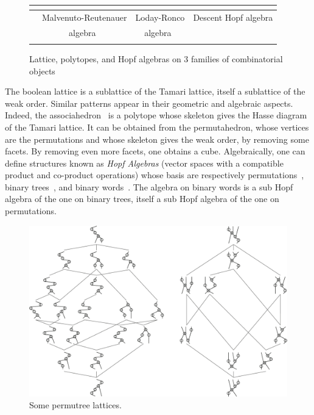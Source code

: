 \documentclass[a4paper,12pt]{article}
\begin{document}
\begin{figure}[h]
\begin{tabular}{l|c|c|c}
	& \cite[Lecture~0]{Ziegler} & \cite{Loday, HohlwegLange} &  \\
	\hline
	\rotatebox{90}{\hspace*{-.8cm} Algebra \;} & Malvenuto-Reutenauer & Loday-Ronco  & Descent Hopf algebra \\
    & algebra~\cite{MalvenutoReutenauer, DuchampHivertThibon} & algebra~\cite{LodayRonco, HivertNovelliThibon-algebraBinarySearchTrees} & \cite{GelfandKrobLascouxLeclercRetakhThibon} \\
    & & & \\
\hline
\end{tabular}
\caption{Lattice, polytopes, and Hopf algebras on 3 families of combinatorial objects}
\label{fig:classicalLattices}
\end{figure}

The boolean lattice is a sublattice of the Tamari lattice, itself a sublattice of the weak order. Similar patterns appear in their geometric and algebraic aspects. Indeed, the associahedron~\cite{Loday,HohlwegLange} is a polytope whose skeleton gives the Hasse diagram of the Tamari lattice. It can be obtained from the permutahedron, whose vertices are the permutations and whose skeleton gives the weak order, by removing some facets. By removing even more facets, one obtains a cube. Algebraically, one can define structures known as \emph{Hopf Algebras} (vector spaces with a compatible product and co-product operations) whose basis are respectively permutations~\cite{MalvenutoReutenauer, DuchampHivertThibon}, binary trees~\cite{LodayRonco, HivertNovelliThibon-algebraBinarySearchTrees}, and binary words~\cite{GelfandKrobLascouxLeclercRetakhThibon}. The algebra on binary words is a sub Hopf algebra of the one on binary trees, itself a sub Hopf algebra of the one on permutations.

\begin{figure}[h]
	\centerline{\includegraphics[scale=.5]{permutreeLattices}}
	\caption{Some permutree lattices.}
	\label{fig:permutreeLattices}
\end{figure}
\end{document}
